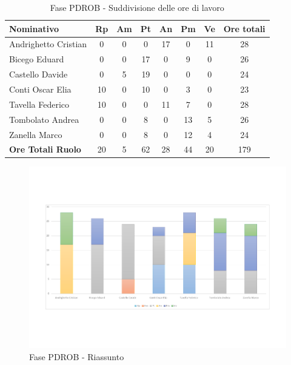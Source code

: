 \documentclass[../PianoProgetto.tex]{subfiles}
\begin{document}
	
	\begin{table}[H]
	
		\begin{tabularx}{\textwidth}{l  * {6}{C}  c}
			\toprule
			\textbf{Nominativo} & \textbf{Rp} & \textbf{Am} & \textbf{Pt} 
						& \textbf{An} & \textbf{Pm} & \textbf{Ve} & \textbf{Ore totali} \\
			\midrule
			Andrighetto Cristian  & 0 & 0 & 0 & 17 & 0 & 11 & 28 \\
			Bicego Eduard  & 0 & 0 & 17 & 0 & 9 & 0 & 26 \\
			Castello Davide  & 0 & 5 & 19 & 0 & 0 & 0 & 24 \\
			Conti Oscar Elia  & 10 & 0 & 10 & 0 & 3 & 0 & 23 \\
			Tavella Federico  & 10 & 0 & 0 & 11 & 7 & 0 & 28 \\
			Tombolato Andrea  & 0 & 0 & 8 & 0 & 13 & 5 & 26 \\
			Zanella Marco & 0 & 0 & 8 & 0 & 12 & 4 & 24 \\
			\midrule			
			\textbf{Ore Totali Ruolo}& 20 & 5 & 62 & 28 & 44 & 20 & 179 \\
			\bottomrule	
		\end{tabularx}
		\caption{Fase PDROB - Suddivisione delle ore di lavoro}
		\label{tab:fasePDROB_ore}
	\end{table}
\vfill
\newpage
\vfill	
		
	\begin{figure}[H]
		\centering
		\includegraphics[width=\textwidth , trim=2cm 4cm 2cm 4cm]{grafici/PDROB/PDROB-ore-persona}
			\caption{Fase PDROB - Riassunto}
		\label{fig:BarChart-fasePDROB_ore}
	\end{figure}
\vfill	
\end{document}
